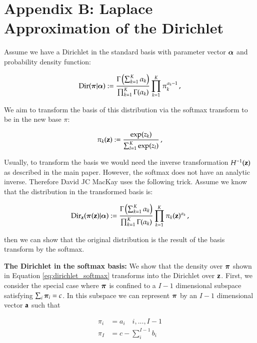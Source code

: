 \section*{Appendix B: Laplace Approximation of the Dirichlet}
\label{sec:LADirichlet}



Assume we have a Dirichlet in the standard basis with parameter vector ${\boldsymbol{\alpha}}$ and probability density function:

\begin{equation}\label{eq:dirichlet}
    \mathrm{Dir}(\boldsymbol{\pi} | {\boldsymbol{\alpha}}) := \frac{\Gamma \left( \sum_{k=1}^K \alpha_k \right)}{\prod_{k=1}^K \Gamma(\alpha_k)} \prod_{k=1}^K \pi_k^{\alpha_k-1} \, ,
\end{equation}

We aim to transform the basis of this distribution via the softmax transform to be in the new base $\pi$:

\begin{equation}\label{eq:softmax}
    \pi_k(\mathbf{z}) := \frac{\exp(z_k)}{\sum_{l=1}^K \exp(z_l)} \, ,
\end{equation}

Usually, to transform the basis we would need the inverse transformation $H^{-1}(\mathbf{z})$ as described in the main paper. However, the softmax does not have an analytic inverse. Therefore David JC MacKay uses the following trick. Assume we know that the distribution in the transformed basis is:

\begin{equation}\label{eq:dirichlet_softmax}
    \mathrm{Dir}_{\mathbf{z}}(\boldsymbol{\pi}(\mathbf{z}) | {\boldsymbol{\alpha}}) := \frac{\Gamma \left( \sum_{k=1}^K \alpha_k \right)}{\prod_{k=1}^K \Gamma(\alpha_k)} \prod_{k=1}^K \pi_k(\mathbf{z})^{\alpha_k} \, ,
\end{equation}

then we can show that the original distribution is the result of the basis transform by the softmax. 

\textbf{The Dirichlet in the softmax basis: } We show that the density over $\boldsymbol{\pi}$ shown in Equation \ref{eq:dirichlet_softmax} transforms into the Dirichlet over $\mathbf{z}$. First, we consider the special case where $\boldsymbol{\pi}$ is confined to a $I-1$ dimensional subspace satisfying $\sum_i \boldsymbol{\pi}_i = c$. In this subspace we can represent $\boldsymbol{\pi}$ by an $I - 1$ dimensional vector $\mathbf{a}$ such that 

\begin{align}
    \pi_i &= a_i \quad i,...,I-1 \\
    \pi_I &= c - \sum_i^{I-1} b_i
\end{align}

